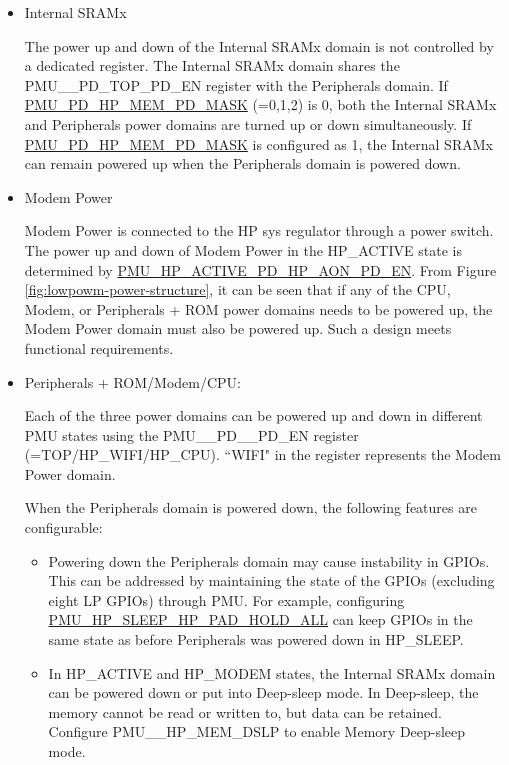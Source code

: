\documentclass[main\_\_EN.tex]{subfiles}
\begin{document}
\begin{itemize}
    \item Internal SRAMx

    The power up and down of the Internal SRAMx domain is not controlled by a dedicated register. The Internal SRAMx domain shares the PMU\_\_PD\_TOP\_PD\_EN register with the Peripherals domain. If \hyperref[fielddesc:PMUPDHPMEM0PDMASK]{PMU\_PD\_HP\_MEM\_PD\_MASK} (=0,1,2) is 0, both the Internal SRAMx and Peripherals power domains are turned up or down simultaneously. If \hyperref[fielddesc:PMUPDHPMEM0PDMASK]{PMU\_PD\_HP\_MEM\_PD\_MASK} is configured as 1, the Internal SRAMx can remain powered up when the Peripherals domain is powered down.

    \item Modem Power

    Modem Power is connected to the HP sys regulator through a power switch. The power up and down of Modem Power in the HP\_ACTIVE state is determined by \hyperref[fielddesc:PMUHPACTIVEPDHPAONPDEN]{PMU\_HP\_ACTIVE\_PD\_HP\_AON\_PD\_EN}. From Figure \ref{fig:lowpowm-power-structure}, it can be seen that if any of the CPU, Modem, or Peripherals + ROM power domains needs to be powered up, the Modem Power domain must also be powered up. Such a design meets functional requirements.

    \item Peripherals + ROM/Modem/CPU:

    Each of the three power domains can be powered up and down in different PMU states using the PMU\_\_PD\_\_PD\_EN register (=TOP/HP\_WIFI/HP\_CPU). ``WIFI" in the register represents the Modem Power domain.

    When the Peripherals domain is powered down, the following features are configurable:
        \begin{itemize}
        \item Powering down the Peripherals domain may cause instability in GPIOs. This can be addressed by maintaining the state of the GPIOs (excluding eight LP GPIOs) through PMU. For example, configuring \hyperref[fielddesc:PMUHPSLEEPHPPADHOLDALL]{PMU\_HP\_SLEEP\_HP\_PAD\_HOLD\_ALL} can keep GPIOs in the same state as before Peripherals was powered down in HP\_SLEEP.

        \item In HP\_ACTIVE and HP\_MODEM states, the Internal SRAMx domain can be powered down or put into Deep-sleep mode. In Deep-sleep, the memory cannot be read or written to, but data can be retained. Configure PMU\_\_HP\_MEM\_DSLP to enable Memory Deep-sleep mode.
        \end{itemize}


\end{itemize}
\end{document}
